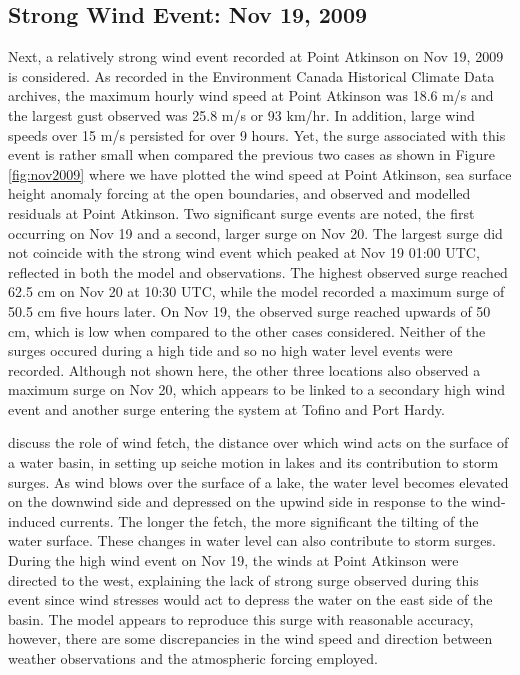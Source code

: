 \documentclass[pdftex,10pt]{article}
\begin{document}
\subsection{Strong Wind Event: Nov 19, 2009}
Next, a relatively strong wind event recorded at Point Atkinson on Nov 19, 2009 is considered. As recorded in the Environment Canada Historical Climate Data archives, the maximum hourly wind speed at Point Atkinson was 18.6 m/s and the largest gust observed was 25.8 m/s or 93 km/hr. In addition, large wind speeds over 15 m/s persisted for over 9 hours. Yet, the surge associated with this event is rather small when compared the previous two cases as shown in Figure \ref{fig:nov2009} where we have plotted the wind speed at Point Atkinson, sea surface height anomaly forcing at the open boundaries, and observed and modelled residuals at Point Atkinson. Two significant surge events are noted, the first occurring on Nov 19 and a second, larger surge on Nov 20. The largest surge did not coincide with the strong wind event which peaked at Nov 19 01:00 UTC, reflected in both the model and observations. The highest observed surge reached 62.5 cm on Nov 20 at 10:30 UTC, while the model recorded a maximum surge of 50.5 cm five hours later. On Nov 19, the observed surge reached upwards of 50 cm, which is low when compared to the other cases considered. Neither of the surges occured during a high tide and so no high water level events were recorded. Although not shown here, the other three locations also observed a maximum surge on Nov 20, which appears to be linked to a secondary high wind event and another surge entering the system at Tofino and Port Hardy. 

\citet{danard2003storm} discuss the role of wind fetch, the distance over which wind acts on the surface of a water basin, in setting up seiche motion in lakes and its contribution to storm surges. As wind blows over the surface of a lake, the water level becomes elevated on the downwind side and depressed on the upwind side in response to the wind-induced currents. The longer the fetch, the more significant the tilting of the water surface. These changes in water level can also contribute to storm surges.  During the high wind event on Nov 19, the winds at Point Atkinson were directed to the west, explaining the lack of strong surge observed during this event since wind stresses would act to depress the water on the east side of the basin. The model appears to reproduce this surge with reasonable accuracy, however, there are some discrepancies in the wind speed and direction between weather observations and the atmospheric forcing employed. 
\end{document}
